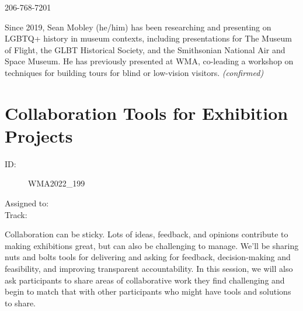 \documentclass{report}
\begin{document}
                206-768-7201\newline

                Since 2019, Sean Mobley (he/him) has been researching and presenting on LGBTQ+ history in museum contexts, including presentations for The Museum of Flight, the GLBT Historical Society, and the Smithsonian National Air and Space Museum. He has previously presented at WMA, co-leading a workshop on techniques for building tours for blind or low-vision visitors.
                \emph{ (confirmed) }
              

              

              
        
          \newpage
          \section{ Collaboration Tools for Exhibition Projects }
            \begin{description}
              \item [ID:]
              WMA2022\_199

              \item [Assigned to:]
                \item [Track:]
              \end{description}

              Collaboration can be sticky. Lots of ideas, feedback, and opinions contribute to making exhibitions great, but can also be challenging to manage. We’ll be sharing nuts and bolts tools for delivering and asking for feedback, decision-making and feasibility, and improving transparent accountability. In this session, we will also ask participants to share areas of collaborative work they find challenging and begin to match that with other participants who might have tools and solutions to share.
\end{document}
